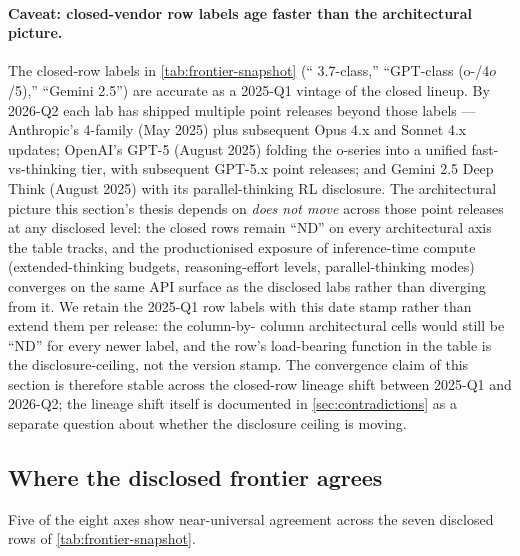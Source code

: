 \paragraph{Caveat: closed-vendor row labels age faster than the
architectural picture.} The closed-row labels in
\cref{tab:frontier-snapshot} (`` 3.7-class,'' ``GPT-class
(o-/$\!4o$/5),'' ``Gemini 2.5'') are accurate as a 2025-Q1 vintage of
the closed lineup. By 2026-Q2 each lab has shipped multiple point
releases beyond those labels --- Anthropic's  4-family
(May 2025) plus subsequent Opus 4.x and Sonnet 4.x updates; OpenAI's
GPT-5 (August 2025) folding the o-series into a unified
fast-vs-thinking tier, with subsequent GPT-5.x point releases; and
Gemini 2.5 Deep Think (August 2025) with its parallel-thinking RL
disclosure. The architectural picture this section's thesis depends on
\emph{does not move} across those point releases at any disclosed
level: the closed rows remain ``ND'' on every architectural axis the
table tracks, and the productionised exposure of inference-time
compute (extended-thinking budgets, reasoning-effort levels,
parallel-thinking modes) converges on the same API surface as the
disclosed labs rather than diverging from it. We retain the 2025-Q1 row labels with
this date stamp rather than extend them per release: the column-by-
column architectural cells would still be ``ND'' for every newer
label, and the row's load-bearing function in the table is the
disclosure-ceiling, not the version stamp. The convergence claim of
this section is therefore stable across the closed-row lineage shift
between 2025-Q1 and 2026-Q2; the lineage shift itself is documented
in \cref{sec:contradictions} as a separate question about whether the
disclosure ceiling is moving.

\subsection{Where the disclosed frontier agrees}
\label{sec:snapshot-agreement}

Five of the eight axes show near-universal agreement across the
seven disclosed rows of \cref{tab:frontier-snapshot}.

